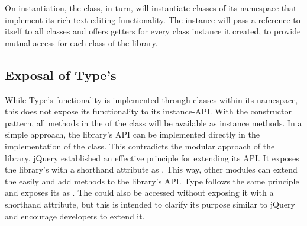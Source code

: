 
On instantiation, the  class, in turn, will instantiate classes of its namespace that implement its rich-text editing functionality. The  instance will pass a reference to itself to all classes and offers getters for every class instance it created, to provide mutual access for each class of the library.





\subsection{Exposal of Type's }
\label{subsec_fn_exposal}

While Type's functionality is implemented through classes within its namespace, this does not expose its functionality to its instance-API. With the constructor pattern, all methods in the  of the  class will be available as instance methods. In a simple approach, the library's API can be implemented directly in the implementation of the  class. This contradicts the modular approach of the library. jQuery established an effective principle for extending its API. It exposes the library's  with a shorthand attribute as . This way, other modules can extend the  easily and add methods to the library's API. Type follows the same principle and exposes its   as . The  could also be accessed without exposing it with a shorthand attribute, but this is intended to clarify its purpose similar to jQuery and encourage developers to extend it.

